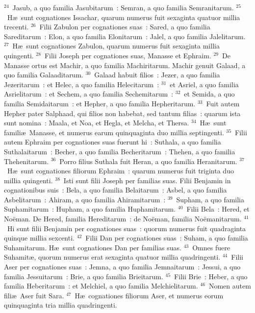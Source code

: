 ${}^{24}$~Jasub, a quo familia Jasubitarum~: Semran, a quo familia Semranitarum.
${}^{25}$~H\ae\ sunt cognationes Issachar, quarum numerus fuit sexaginta quatuor millia trecenti.
${}^{26}$~Filii Zabulon per cognationes suas~: Sared, a quo familia Sareditarum~: Elon, a quo familia Elonitarum~: Jalel, a quo familia Jalelitarum.
${}^{27}$~H\ae\ sunt cognationes Zabulon, quarum numerus fuit sexaginta millia quingenti.
${}^{28}$~Filii Joseph per cognationes suas, Manasse et Ephraim.
${}^{29}$~De Manasse ortus est Machir, a quo familia Machiritarum. Machir genuit Galaad, a quo familia Galaaditarum.
${}^{30}$~Galaad habuit filios~: Jezer, a quo familia Jezeritarum~: et Helec, a quo familia Helecitarum~:
${}^{31}$~et Asriel, a quo familia Asrielitarum~: et Sechem, a quo familia Sechemitarum~:
${}^{32}$~et Semida, a quo familia Semidaitarum~: et Hepher, a quo familia Hepheritarum.
${}^{33}$~Fuit autem Hepher pater Salphaad, qui filios non habebat, sed tantum filias~: quarum ista sunt nomina~: Maala, et Noa, et Hegla, et Melcha, et Thersa.
${}^{34}$~H\ae\ sunt famili\ae\ Manasse, et numerus earum quinquaginta duo millia septingenti.
${}^{35}$~Filii autem Ephraim per cognationes suas fuerunt hi~: Suthala, a quo familia Suthalaitarum~: Becher, a quo familia Becheritarum~: Thehen, a quo familia Thehenitarum.
${}^{36}$~Porro filius Suthala fuit Heran, a quo familia Heranitarum.
${}^{37}$~H\ae\ sunt cognationes filiorum Ephraim~: quarum numerus fuit triginta duo millia quingenti.
${}^{38}$~Isti sunt filii Joseph per familias suas. Filii Benjamin in cognationibus suis~: Bela, a quo familia Belaitarum~: Asbel, a quo familia Asbelitarum~: Ahiram, a quo familia Ahiramitarum~:
${}^{39}$~Supham, a quo familia Suphamitarum~: Hupham, a quo familia Huphamitarum.
${}^{40}$~Filii Bela~: Hered, et No\"eman. De Hered, familia Hereditarum~: de No\"eman, familia No\"emanitarum.
${}^{41}$~Hi sunt filii Benjamin per cognationes suas~: quorum numerus fuit quadraginta quinque millia sexcenti.
${}^{42}$~Filii Dan per cognationes suas~: Suham, a quo familia Suhamitarum. H\ae\ sunt cognationes Dan per familias suas.
${}^{43}$~Omnes fuere Suhamit\ae , quorum numerus erat sexaginta quatuor millia quadringenti.
${}^{44}$~Filii Aser per cognationes suas~: Jemna, a quo familia Jemnaitarum~: Jessui, a quo familia Jessuitarum~: Brie, a quo familia Brieitarum.
${}^{45}$~Filii Brie~: Heber, a quo familia Heberitarum~: et Melchiel, a quo familia Melchielitarum.
${}^{46}$~Nomen autem fili\ae\ Aser fuit Sara.
${}^{47}$~H\ae\ cognationes filiorum Aser, et numerus eorum quinquaginta tria millia quadringenti.
